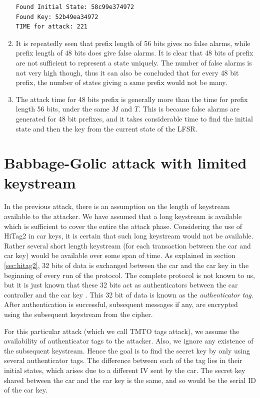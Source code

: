 \begin{enumerate}
\begin{lstlisting}[frame=tb]
Found Initial State: 58c99e374972
Found Key: 52b49ea34972
TIME for attack: 221
\end{lstlisting}

\item It is repeatedly seen that prefix length of 56 bits gives no false alarms, while prefix length of 48 bits does give false alarms. It is clear that 48 bits of prefix are not sufficient to represent a state uniquely. The number of false alarms is not very high though, thus it can also be concluded that for every 48 bit prefix, the number of states giving a same prefix would not be many.
 
\item The attack time for 48 bits prefix is generally more than the time for prefix length 56 bits, under the same $M$ and $T$. This is because false alarms are generated for 48 bit prefixes, and it takes considerable time to find the initial state and then the key from the current state of the LFSR.

\end{enumerate}

\section{Babbage-Golic attack with limited keystream}
\label{sec:bg-tags-attack}

In the previous attack, there is an assumption on the length of keystream available to the attacker. We have assumed that a long keystream is available which is sufficient to cover the entire the attack phase. Considering the use of HiTag2 in car keys, it is certain that such long keystream would not be available. Rather several short length keystream (for each transaction between the car and car key) would be available over some span of time. As explained in section \ref{sec:hitag2}, 32 bits of data is exchanged between the car and the car key in the beginning of every run of the protocol. The complete protocol is not known to us, but it is just known that these 32 bits act as authenticators between the car controller and the car key \cite{email-ruptor} \cite{hitag2-code}. This 32 bit of data is known as the \emph{authenticator tag}. After authentication is successful, subsequent messages if any, are encrypted using the subsequent keystream from the cipher.

For this particular attack (which we call TMTO tags attack), we assume the availability of authenticator tags to the attacker. Also, we ignore any existence of the subsequent keystream. Hence the goal is to find the secret key by only using several authenticator tags. The difference between each of the tag lies in their initial states, which arises due to a different IV sent by the car. The secret key shared between the car and the car key is the same, and so would be the serial ID of the car key.

